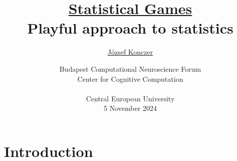 \documentclass{beamer}
\theoremstyle{definition}
\begin{document}




\title[\href{https://arxiv.org/abs/2402.15892}{Statistical Games}]{\href{https://arxiv.org/abs/2402.15892}{Statistical Games} \\ {\small Playful approach to statistics}}
\author{\href{https://konczer.github.io/}{József Konczer}}
\date{Budapest Computational Neuroscience Forum \\ Center for Cognitive
Computation
\\
\ 
\\ 
Central European University \\ 5 November 2024}

\begin{frame}
\titlepage
\end{frame}





\section{Introduction}
\end{document}
